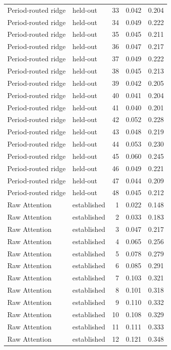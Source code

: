 \begin{tabular}{llrrr}
Period-routed ridge & held-out & 33 & 0.042 & 0.204 \\
Period-routed ridge & held-out & 34 & 0.049 & 0.222 \\
Period-routed ridge & held-out & 35 & 0.045 & 0.211 \\
Period-routed ridge & held-out & 36 & 0.047 & 0.217 \\
Period-routed ridge & held-out & 37 & 0.049 & 0.222 \\
Period-routed ridge & held-out & 38 & 0.045 & 0.213 \\
Period-routed ridge & held-out & 39 & 0.042 & 0.205 \\
Period-routed ridge & held-out & 40 & 0.041 & 0.204 \\
Period-routed ridge & held-out & 41 & 0.040 & 0.201 \\
Period-routed ridge & held-out & 42 & 0.052 & 0.228 \\
Period-routed ridge & held-out & 43 & 0.048 & 0.219 \\
Period-routed ridge & held-out & 44 & 0.053 & 0.230 \\
Period-routed ridge & held-out & 45 & 0.060 & 0.245 \\
Period-routed ridge & held-out & 46 & 0.049 & 0.221 \\
Period-routed ridge & held-out & 47 & 0.044 & 0.209 \\
Period-routed ridge & held-out & 48 & 0.045 & 0.212 \\
Raw Attention & established & 1 & 0.022 & 0.148 \\
Raw Attention & established & 2 & 0.033 & 0.183 \\
Raw Attention & established & 3 & 0.047 & 0.217 \\
Raw Attention & established & 4 & 0.065 & 0.256 \\
Raw Attention & established & 5 & 0.078 & 0.279 \\
Raw Attention & established & 6 & 0.085 & 0.291 \\
Raw Attention & established & 7 & 0.103 & 0.321 \\
Raw Attention & established & 8 & 0.101 & 0.318 \\
Raw Attention & established & 9 & 0.110 & 0.332 \\
Raw Attention & established & 10 & 0.108 & 0.329 \\
Raw Attention & established & 11 & 0.111 & 0.333 \\
Raw Attention & established & 12 & 0.121 & 0.348 \\

\end{tabular}
